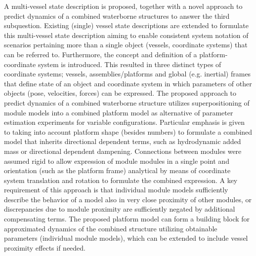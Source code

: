 A multi-vessel state description is proposed, together with a novel approach to predict dynamics of a combined waterborne structures to answer the third subquestion. Existing (single) vessel state descriptions are extended to formulate this multi-vessel state description aiming to enable consistent system notation of scenarios pertaining more than a single object (vessels, coordinate systems) that can be referred to. Furthermore, the concept and definition of a platform-coordinate system is introduced. This resulted in three distinct types of coordinate systems; vessels, assemblies/platforms and global (e.g. inertial) frames that define state of an object and coordinate system in which parameters of other objects (pose, velocities, forces) can be expressed. 
The proposed approach to predict dynamics of a combined waterborne structure utilizes superpositioning of module models into a combined platform model as alternative of parameter estimation experiments for variable configurations. Particular emphasis is given to taking into account platform shape (besides numbers) to formulate a combined model that inherits directional dependent terms, such as hydrodynamic added mass or directional dependent dampening. Connections between modules were assumed rigid to allow expression of module modules in a single point and orientation (such as the platform frame) analytical by means of coordinate system translation and rotation to formulate the combined expression. A key requirement of this approach is that individual module models sufficiently describe the behavior of a model also in very close proximity of other modules, or discrepancies due to module proximity are sufficiently negated by additional compensating terms. The proposed platform model can form a building block for approximated dynamics of the combined structure utilizing obtainable parameters (individual module models), which can be extended to include vessel proximity effects if needed. 


